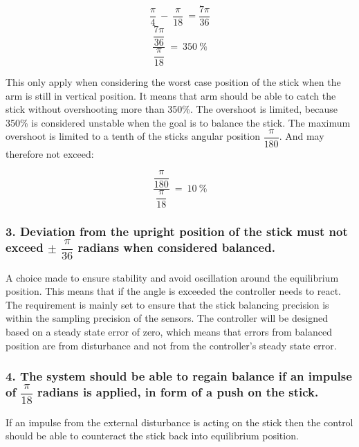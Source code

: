 \begin{equation}
\dfrac{\pi}{4}\ -\ \dfrac{\pi}{18}\ = \dfrac{7\pi}{36}
\end{equation}
\begin{equation}
\frac{\dfrac{7\pi}{36}}{\dfrac{\pi}{18}}\ =\ 350\ \% 
\end{equation}

This only apply when considering the worst case position of the stick when the arm is still in vertical position. It means that arm should be able to catch the stick without overshooting more than 350\%. The overshoot is limited, because 350\% is considered unstable when the goal is to balance the stick. The maximum overshoot is limited to a tenth of the sticks angular position $\dfrac{\pi}{180}$. And may therefore not exceed:

\begin{equation}
\frac{\dfrac{\pi}{180}}{\dfrac{\pi}{18}}\ =\ 10\ \% 
\end{equation}


\subsubsection*{3. Deviation from the upright position of the stick must not exceed $\pm$ $\dfrac{\pi}{36}$ radians when considered balanced.}
\forceindent A choice made to ensure stability and avoid oscillation around the equilibrium position.
This means that if the angle is exceeded the controller needs to react. The requirement is mainly set to ensure that the stick balancing precision is within the sampling precision of the sensors. The controller will be designed based on a steady state error of zero, which means that errors from balanced position are from disturbance and not from the controller's steady state error.

\subsubsection*{4. The system should be able to regain balance if an impulse of $\dfrac{\pi}{18}$ radians is applied, in form of a push on the stick.} 
\forceindent If an impulse from the external disturbance is acting on the stick then the control should be able to counteract the stick back into equilibrium position.   



